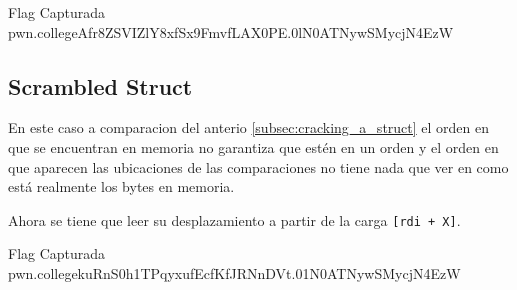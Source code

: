 \begin{flagbox}{Flag Capturada}
	pwn.college{Afr8ZSVIZlY8xfSx9FmvfLAX0PE.0lN0ATNywSMycjN4EzW}
\end{flagbox}
\subsection{Scrambled Struct}\label{subsec:scrambled_struct}

En este caso a comparacion del anterio \ref{subsec:cracking_a_struct} el orden
en que se encuentran en memoria no garantiza que estén en un orden y el orden en que aparecen las ubicaciones de
las comparaciones no tiene nada que ver en como está realmente los bytes en memoria.

Ahora se tiene que leer su desplazamiento a partir de la carga \texttt{[rdi + X]}.
\begin{flagbox}{Flag Capturada}
	pwn.college{kuRnS0h1TPqyxufEcfKfJRNnDVt.01N0ATNywSMycjN4EzW}
\end{flagbox}
